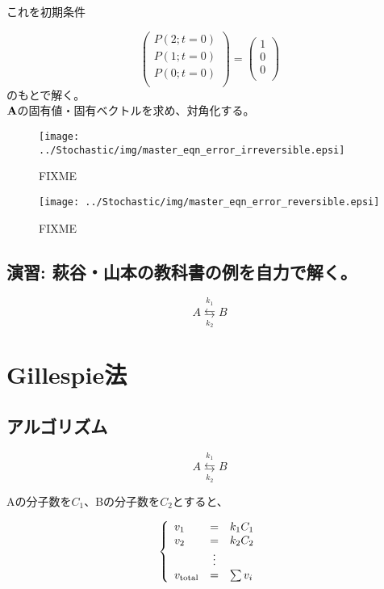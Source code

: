 これを初期条件

\[
\left(
\begin{array}{l}
P(2;t=0)\\
P(1;t=0)\\
P(0;t=0)\\
\end{array}
\right)
=
\left(
\begin{array}{l}
1\\
0\\
0\\
\end{array}
\right)
\]
のもとで解く。\\
\indent \({\bf A}\)の固有値・固有ベクトルを求め、対角化する。

\begin{figure}[ht]
\centering
\texttt{[image: ../Stochastic/img/master\_eqn\_error\_irreversible.epsi]}
\caption{FIXME}
\label{fig:stochastic2}
\end{figure}


\begin{figure}[ht]
\centering
\texttt{[image: ../Stochastic/img/master\_eqn\_error\_reversible.epsi]}
\caption{FIXME}
\label{fig:stochastic3}
\end{figure}


\subsection{演習: 萩谷・山本の教科書の例を自力で解く。}

\[A \overset{k_1}{\underset{k_2}\leftrightarrows} B\]

\section{Gillespie法}
\subsection{アルゴリズム}
\[A \overset{k_1}{\underset{k_2}\leftrightarrows} B\]

Aの分子数を$C_1$、Bの分子数を$C_2$とすると、

\[\left\{
\begin{array}{lcl}
v_1 & = & k_1 C_1 \\ 
v_2 & = & k_2 C_2 \\ 
    & \vdots & \\
v_{\rm total} & = & \sum v_i\\ 
\end{array}
\right.\]

